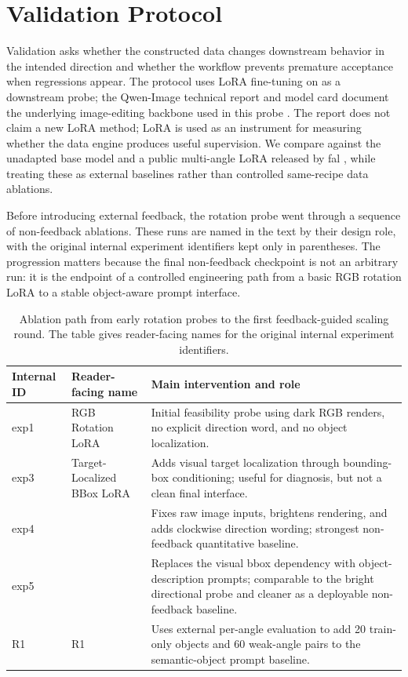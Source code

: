 \section{Validation Protocol}
\label{sec:validation}

Validation asks whether the constructed data changes downstream behavior in the intended direction and whether the workflow prevents premature acceptance when regressions appear. The protocol uses LoRA fine-tuning \cite{hu2021lora} on \qwenedit{} as a downstream probe; the Qwen-Image technical report and \qwenedit{} model card document the underlying image-editing backbone used in this probe \cite{wu2025qwenimage,qwen2025qwenimageedit2511}. The report does not claim a new LoRA method; LoRA is used as an instrument for measuring whether the data engine produces useful supervision. We compare against the unadapted base model and a public multi-angle LoRA released by fal \cite{fal2026qwenmultianglelora}, while treating these as external baselines rather than controlled same-recipe data ablations.

Before introducing external feedback, the rotation probe went through a sequence of non-feedback ablations. These runs are named in the text by their design role, with the original internal experiment identifiers kept only in parentheses. The progression matters because the final non-feedback checkpoint is not an arbitrary run: it is the endpoint of a controlled engineering path from a basic RGB rotation LoRA to a stable object-aware prompt interface.

\begin{table}[t]
\centering
\small
\caption{Ablation path from early rotation probes to the first feedback-guided scaling round. The table gives reader-facing names for the original internal experiment identifiers.}
\label{tab:experiment-evolution}
\begin{tabularx}{\linewidth}{l l X}
\toprule
Internal ID & Reader-facing name & Main intervention and role \\
\midrule
exp1 & RGB Rotation LoRA & Initial feasibility probe using dark RGB renders, no explicit direction word, and no object localization. \\
exp3 & Target-Localized BBox LoRA & Adds visual target localization through bounding-box conditioning; useful for diagnosis, but not a clean final interface. \\
exp4 & \brightprobe{} & Fixes raw image inputs, brightens rendering, and adds clockwise direction wording; strongest non-feedback quantitative baseline. \\
exp5 & \semanticprobe{} & Replaces the visual bbox dependency with object-description prompts; comparable to the bright directional probe and cleaner as a deployable non-feedback baseline. \\
R1 & \feedbackprobe{} R1 & Uses external per-angle evaluation to add 20 train-only objects and 60 weak-angle pairs to the semantic-object prompt baseline. \\
\bottomrule
\end{tabularx}
\end{table}

